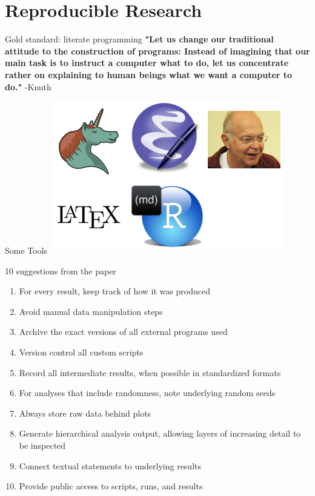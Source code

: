 \documentclass[t,10pt]{beamer}
\begin{document}
\section{Reproducible Research}
\label{sec:orgheadline32}
\begin{frame}[label={sec:orgheadline29}]{Gold standard: literate programming}
\textbf{\Large "Let us change our traditional attitude to the construction of programs: Instead of imagining that our main task is to instruct a computer what to do, let us concentrate rather on explaining to human beings what we want a computer to do."} -Knuth
\end{frame}
\begin{frame}[label={sec:orgheadline30}]{Some Tools}
\includegraphics[width=.9\linewidth]{figures/out.png}
\end{frame}
\begin{frame}[label={sec:orgheadline31}]{10 suggestions from the paper}
\begin{enumerate}
\item For every result, keep track of how it was produced
\item Avoid manual data manipulation steps
\item Archive the exact versions of all external programs used
\item Version control all custom scripts
\item Record all intermediate results, when possible in standardized formats
\item For analyses that include randomness, note underlying random seeds
\item Always store raw data behind plots
\item Generate hierarchical analysis output, allowing layers of increasing detail to be inspected
\item Connect textual statements to underlying results
\item Provide public access to scripts, runs, and results
\end{enumerate}
\end{frame}
\end{document}
